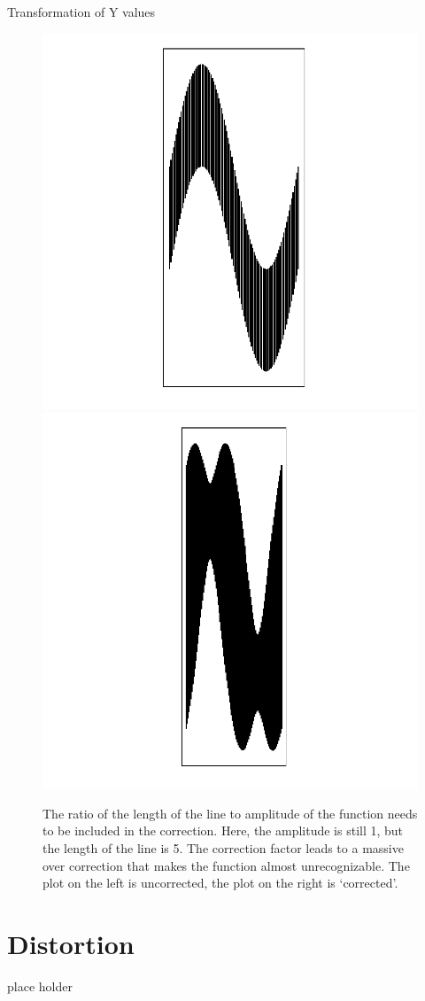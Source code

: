 \documentclass[11pt]{article}\usepackage{graphicx, color}
\newenvironment{knitrout}{}{} %
\begin{document}
\begin{subsection}{Transformation of Y values}
\begin{figure}
\begin{knitrout}
{\centering \includegraphics[width=0.49 \textwidth]{figure/fig-thirdfix1} 
\includegraphics[width=0.49 \textwidth]{figure/fig-thirdfix2} 

}



\end{knitrout}

\caption{\label{thirdfix} The ratio of the length of the line to amplitude of the function needs to be included in the correction. Here, the amplitude is still 1, but the length of the line is 5. The correction factor leads to a massive over correction that makes the function almost unrecognizable. The plot on the left is uncorrected, the plot on the right is `corrected'.}
\end{figure}


\end{subsection}\clearpage
\section{Distortion} \label{distortion}
place holder
\end{document}
